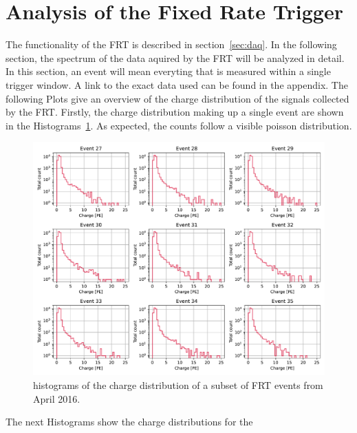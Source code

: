 \section{Analysis of the Fixed Rate Trigger}

The functionality of the FRT is described in section~\ref{sec:daq}. In the following section, the spectrum of the data aquired by the FRT will be analyzed in 
detail. In this section, an event will mean everyting that is measured within a single trigger window. A link to the exact data used can be found 
in the appendix. The following Plots give an overview of the charge distribution of the signals collected by the FRT. Firstly, the charge distribution making up a 
single event are shown in the Histograms~\ref{fig:single_charge_hist}. As expected, the counts follow a visible poisson distribution.

\begin{figure}
    \centering
    \includegraphics[width=\textwidth]{Plots/single_charge_hist.pdf}
    \caption{histograms of the charge distribution of a subset of FRT events from April 2016.}
    \label{fig:single_charge_hist}
\end{figure}
\FloatBarrier

The next Histograms show the charge distributions for the 